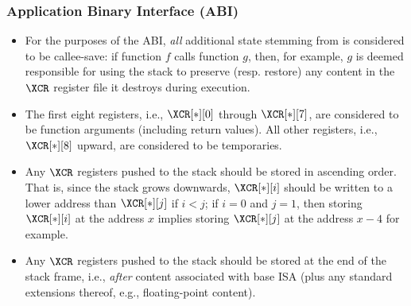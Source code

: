 
\subsubsection{Application Binary Interface (ABI)}
\label{sec:spec:state:abi}

\begin{itemize}
\item For the purposes of the ABI, {\em all} additional state stemming from 
      \XCID is considered to be callee-save: if function $f$ calls function
      $g$, then, for example, $g$ is deemed responsible for using the stack
      to preserve (resp. restore) any content in the $\XCR$ register file 
      it destroys during execution.
\item The first eight registers, 
      i.e., $\XCR[*][0]$ through $\XCR[*][7]$, 
      are considered to be function arguments (including return values).
      All other registers, 
      i.e., $\XCR[*][8]$ upward,
      are considered to be temporaries.
\item Any $\XCR$ registers pushed to the stack should be stored in ascending 
      order.  That is, since the stack grows downwards, 
      $\XCR[*][i]$
      should be written to a lower address than
      $\XCR[*][j]$
      if $i < j$; if $i = 0$ and $j = 1$, then storing $\XCR[*][i]$ at the
      address $x$ implies storing $\XCR[*][j]$ at the address $x - 4$ for
      example.
\item Any $\XCR$ registers pushed to the stack should be stored 
      at the end of the stack frame, 
      i.e., {\em after} content associated with base ISA (plus any standard 
      extensions thereof, e.g., floating-point content).
\end{itemize}

